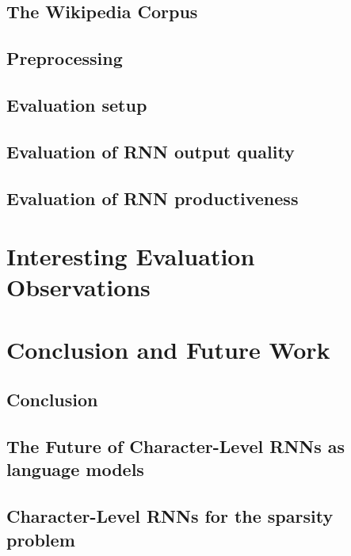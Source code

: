 \documentclass[11pt,a4paper,twoside,openright]{scrbook}
\begin{document}
\section{The Wikipedia Corpus}
\section{Preprocessing}
\section{Evaluation setup}
\section{Evaluation of RNN output quality}
\section{Evaluation of RNN productiveness}

\chapter{Interesting Evaluation Observations}

\chapter{Conclusion and Future Work}
\section{Conclusion}
\section{The Future of Character-Level RNNs as language models}
\section{Character-Level RNNs for the sparsity problem}



\newpage

\listoffigures
\newpage

\listoftables
\newpage

\end{document}
